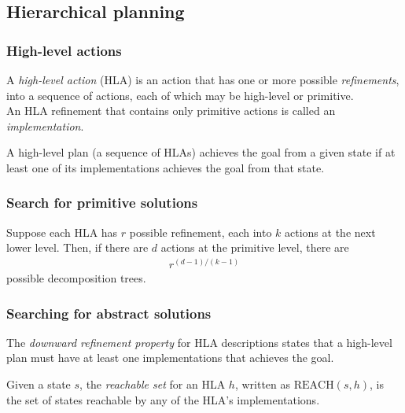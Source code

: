 \documentclass{article}
\begin{document}
\subsection{Hierarchical planning}

\subsubsection{High-level actions}

\begin{definition}
    A \emph{high-level action} (HLA) is an action that has one or more possible
    \emph{refinements}, into a sequence of actions, each of which may be high-level
    or primitive.\\
    An HLA refinement that contains only primitive actions is called an
    \emph{implementation}.
\end{definition}

\begin{definition}
    A high-level plan (a sequence of HLAs) achieves the goal from a given state
    if at least one of its implementations achieves the goal from that state.
\end{definition}

\subsubsection{Search for primitive solutions}

\begin{theorem}
    Suppose each HLA has $r$ possible refinement, each into $k$ actions at the
    next lower level. Then, if there are $d$ actions at the primitive level,
    there are
    \begin{align*}
        r^{(d-1)/(k-1)}
    \end{align*}
    possible decomposition trees.
\end{theorem}

\subsubsection{Searching for abstract solutions}

\begin{definition}
    The \emph{downward refinement property} for HLA descriptions states that
    a high-level plan must have at least one implementations that achieves the
    goal.
\end{definition}

\begin{definition}
    Given a state $s$, the \emph{reachable set} for an HLA $h$, written as
    $\text{REACH}(s,h)$, is the set of states reachable by any of the HLA's
    implementations.
\end{definition}
\end{document}
